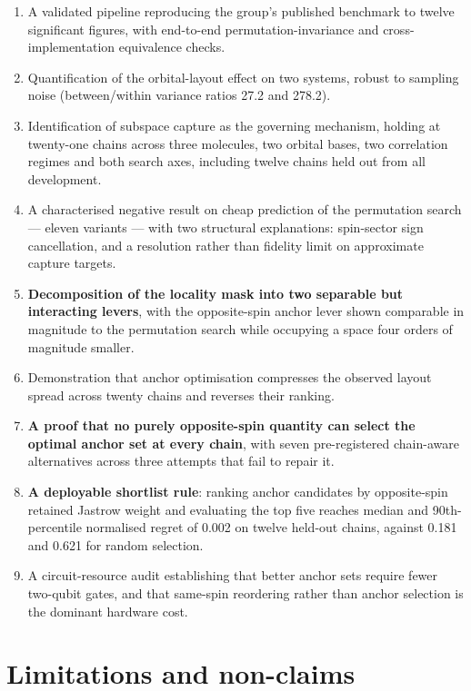 \documentclass[11pt,a4paper]{article}
\begin{document}
\begin{enumerate}\itemsep3pt
  \item A validated pipeline reproducing the group's published benchmark to
        twelve significant figures, with end-to-end permutation-invariance
        and cross-implementation equivalence checks.
  \item Quantification of the orbital-layout effect on two systems, robust to
        sampling noise (between/within variance ratios 27.2 and 278.2).
  \item Identification of subspace capture as the governing mechanism,
        holding at twenty-one chains across three molecules, two orbital
        bases, two correlation regimes and both search axes, including twelve
        chains held out from all development.
  \item A characterised negative result on cheap prediction of the
        permutation search --- eleven variants --- with two structural
        explanations: spin-sector sign cancellation, and a resolution rather
        than fidelity limit on approximate capture targets.
  \item \textbf{Decomposition of the locality mask into two separable but
        interacting levers}, with the opposite-spin anchor lever shown
        comparable in magnitude to the permutation search while occupying a
        space four orders of magnitude smaller.
  \item Demonstration that anchor optimisation compresses the observed layout
        spread across twenty chains and reverses their ranking.
  \item \textbf{A proof that no purely opposite-spin quantity can select the
        optimal anchor set at every chain}, with seven pre-registered
        chain-aware alternatives across three attempts that fail to repair
        it.
  \item \textbf{A deployable shortlist rule}: ranking anchor candidates by
        opposite-spin retained Jastrow weight and evaluating the top five
        reaches median and 90th-percentile normalised regret of 0.002 on
        twelve held-out chains, against 0.181 and 0.621 for random selection.
  \item A circuit-resource audit establishing that better anchor sets require
        fewer two-qubit gates, and that same-spin reordering rather than
        anchor selection is the dominant hardware cost.
\end{enumerate}

\section{Limitations and non-claims}
\end{document}

